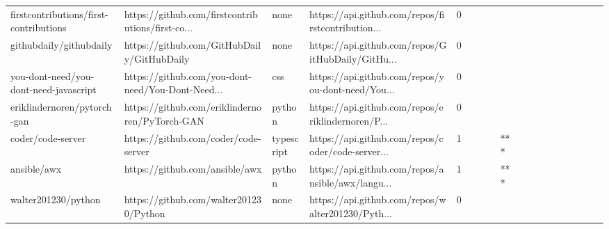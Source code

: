 \begin{tabular}{llllrlllllllllllll}
firstcontributions/first-contributions             &  https://github.com/firstcontributions/first-co... &              none &  https://api.github.com/repos/firstcontribution... &       0 &         &        &           &                &                 &        &           &           &          &          &       &              &          \\
githubdaily/githubdaily                            &         https://github.com/GitHubDaily/GitHubDaily &              none &  https://api.github.com/repos/GitHubDaily/GitHu... &       0 &         &        &           &                &                 &        &           &           &          &          &       &              &          \\
you-dont-need/you-dont-need-javascript             &  https://github.com/you-dont-need/You-Dont-Need... &               css &  https://api.github.com/repos/you-dont-need/You... &       0 &         &        &           &                &                 &        &           &           &          &          &       &              &          \\
eriklindernoren/pytorch-gan                        &     https://github.com/eriklindernoren/PyTorch-GAN &            python &  https://api.github.com/repos/eriklindernoren/P... &       0 &         &        &           &                &                 &        &           &           &          &          &       &              &          \\
coder/code-server                                  &               https://github.com/coder/code-server &        typescript &  https://api.github.com/repos/coder/code-server... &       1 &         &        &           &            *** &                 &        &           &           &          &          &       &              &          \\
ansible/awx                                        &                     https://github.com/ansible/awx &            python &  https://api.github.com/repos/ansible/awx/langu... &       1 &         &        &           &            *** &                 &        &           &           &          &          &       &              &          \\
walter201230/python                                &             https://github.com/walter201230/Python &              none &  https://api.github.com/repos/walter201230/Pyth... &       0 &         &        &           &                &                 &        &           &           &          &          &       &              &          \\

\end{tabular}

